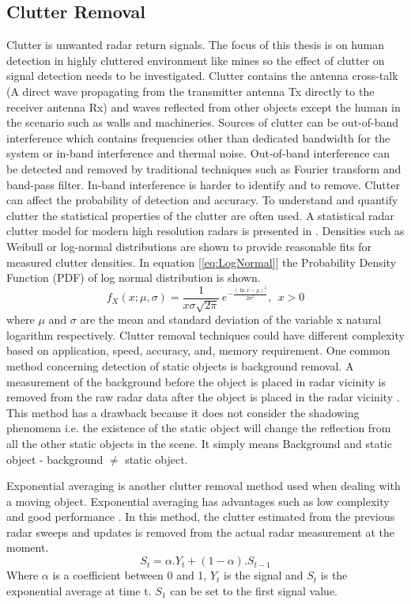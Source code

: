 \subsection{Clutter Removal}
Clutter is unwanted radar return signals. The focus of this thesis is on human detection in highly cluttered environment like mines so the effect of clutter on signal detection needs to be investigated. Clutter contains the antenna cross-talk (A direct wave propagating from the transmitter antenna Tx directly to the receiver antenna Rx) and waves reflected from other objects except the human in the scenario such as walls and machineries. Sources of clutter can be out-of-band interference which contains frequencies other than dedicated bandwidth for the system or in-band interference and thermal noise. Out-of-band interference can be detected and removed by traditional techniques such as Fourier transform and band-pass filter. In-band interference is harder to identify and to remove. Clutter can affect the probability of detection and accuracy. To understand and quantify clutter the statistical properties of the clutter are often used. A statistical radar clutter model for modern high resolution radars is presented in \cite{clutterModel}. Densities such as Weibull or log-normal distributions are shown to provide reasonable fits for measured clutter densities. In equation [\ref{eq:LogNormal}] the Probability Density Function (PDF) of log normal distribution is shown.
\begin{equation}
f_X(x;\mu,\sigma) = \frac{1}{ x\sigma \sqrt{2 \pi}}\, e^{-\frac{(\ln x - \mu)^2}{2\sigma^2}},\ \ x>0
\label{eq:LogNormal}
\end{equation}
where $\mu$ and $\sigma$ are the mean and standard deviation of the variable x natural logarithm respectively.
 Clutter removal techniques could have different complexity based on application, speed, accuracy, and, memory requirement. One common method concerning detection of static objects is background removal. A measurement of the background before the object is placed in radar vicinity is removed from the raw radar data after the object is placed in the radar vicinity \cite{BryanClassification}. This method has a drawback because it does not consider the shadowing phenomena i.e. the existence of the static object will change the reflection from all the other static objects in the scene. It simply means Background and static object - background $\neq$ static object.

Exponential averaging is another clutter removal method used when dealing with a moving object. Exponential averaging has advantages such as low complexity and good performance \cite{Zetik}. In this method, the clutter estimated from the previous radar sweeps and updates is removed from the actual radar measurement at the moment.
\begin{equation}
S_{t} =\alpha .Y_{t} + (1-\alpha).S_{t-1}
\end{equation}
Where $\alpha$ is a coefficient between 0 and 1, $Y_{t}$ is the signal and $S_{t}$ is the exponential average at time t. $S_{1}$ can be set to the first signal value. 

